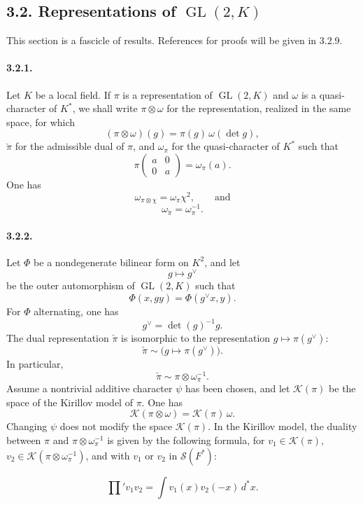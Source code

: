 \documentclass[10pt,a4paper]{article}
\providecommand{\GL}{\operatorname{GL}}
\providecommand{\sprod}{\mathop{\prod}\nolimits'}
\providecommand{\cK}{\mathcal K}
\providecommand{\cS}{\mathcal S}
\begin{document}
\subsection*{3.2. Representations of \(\GL(2,K)\)}

This section is a fascicle of results. References for proofs will be given in 3.2.9.

\paragraph{3.2.1.} Let \(K\) be a local field. If \(\pi\) is a representation of \(\GL(2,K)\) and \(\omega\) is a quasi-character of \(K^*\), we shall write \(\pi\otimes\omega\) for the representation, realized in the same space, for which
\[
(\pi\otimes\omega)(g)=\pi(g)\,\omega(\det g),
\]
\(\check\pi\) for the admissible dual of \(\pi\), and \(\omega_\pi\) for the quasi-character of \(K^*\) such that
\[
\pi\!\left(\begin{smallmatrix}a&0\\0&a\end{smallmatrix}\right)=\omega_\pi(a).
\]
One has
\[
\tag{3.2.1.1}
\omega_{\pi\otimes\chi}=\omega_\pi\chi^2,
\qquad\text{and}
\]
\[
\tag{3.2.1.2}
\omega_{\check\pi}=\omega_\pi^{-1}.
\]

\paragraph{3.2.2.} Let \(\Phi\) be a nondegenerate bilinear form on \(K^2\), and let
\[
g\longmapsto g^\vee
\]
be the outer automorphism of \(\GL(2,K)\) such that
\[
\Phi(x,gy)=\Phi(g^\vee x,y).
\]
For \(\Phi\) alternating, one has
\[
g^\vee=\det(g)^{-1}g.
\]
The dual representation \(\check\pi\) is isomorphic to the representation \(g\mapsto\pi(g^\vee)\):
\[
\tag{3.2.2.1}
\check\pi\sim\bigl(g\longmapsto\pi(g^\vee)\bigr).
\]
In particular,
\[
\tag{3.2.2.2}
\check\pi\sim\pi\otimes\omega_\pi^{-1}.
\]
Assume a nontrivial additive character \(\psi\) has been chosen, and let \(\cK(\pi)\) be the space of the Kirillov model of \(\pi\). One has
\[
\tag{3.2.2.3}
\cK(\pi\otimes\omega)=\cK(\pi)\,\omega.
\]
Changing \(\psi\) does not modify the space \(\cK(\pi)\). In the Kirillov model, the duality between \(\pi\) and \(\pi\otimes\omega_\pi^{-1}\) is given by the following formula, for \(v_1\in\cK(\pi)\), \(v_2\in\cK(\pi\otimes\omega_\pi^{-1})\), and with \(v_1\) or \(v_2\) in \(\cS(F^*)\):

\clearpage
{}
\hypertarget{authority-42}{}
\[
\tag{3.2.2.4}
\sprod{v_1}{v_2}=\int v_1(x)v_2(-x)\,d^*x.
\]
\end{document}
